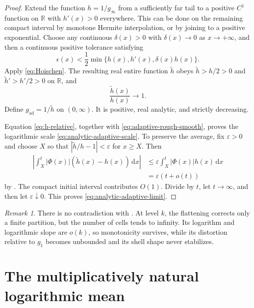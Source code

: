 \documentclass[11pt,oneside]{article}
\numberwithin{equation}{section}
\theoremstyle{definition}
\theoremstyle{remark}
\newtheorem{remark}[theorem]{Remark}
\newcommand{\R}{\mathbb R}
\newcommand{\dd}{\,\mathrm d}
\newcommand{\abs}[1]{\left|#1\right|}
\newcommand{\PhiUp}{\Phi}
\begin{document}
\begin{proof}
Extend the function \(h=1/g_\infty\) from a sufficiently far tail to a positive
\(C^1\) function on \(\R\) with \(h'(x)>0\) everywhere.  This can be done on the remaining
compact interval by monotone Hermite interpolation, or by joining to a positive exponential.
Choose any continuous \(\delta(x)>0\) with \(\delta(x)\to0\) as \(x\to+\infty\), and then
a continuous positive tolerance satisfying
\begin{equation}
 \epsilon(x)<\frac12\min\{h(x),h'(x),\delta(x)h(x)\}.
 \label{eq:analytic-tolerance}
\end{equation}
Apply \eqref{eq:Hoischen}.  The resulting real entire function \(\widetilde h\) obeys
\(
 \widetilde h>h/2>0
\) and \(\widetilde h'>h'/2>0\) on \(\R\), and
\begin{equation}
 \frac{\widetilde h(x)}{h(x)}\longrightarrow1.
 \label{eq:h-relative}
\end{equation}
Define \(g_{\mathrm{ad}}=1/\widetilde h\) on \((0,\infty)\).  It is positive, real analytic,
and strictly decreasing.

Equation \eqref{eq:h-relative}, together with
\eqref{eq:adaptive-rough-smooth}, proves the logarithmic scale
\eqref{eq:analytic-adaptive-scale}.  To preserve the average, fix \(\varepsilon>0\) and
choose \(X\) so that \(|\widetilde h/h-1|<\varepsilon\) for \(x\ge X\).  Then
\begin{align*}
 \left|\int_X^t\abs{\PhiUp(x)}(\widetilde h(x)-h(x))\dd x\right|
 &\le\varepsilon\int_X^t\abs{\PhiUp(x)}h(x)\dd x\\
 &=\varepsilon(t+o(t))
\end{align*}
by .  The compact initial interval contributes \(O(1)\).
Divide by \(t\), let \(t\to\infty\), and then let \(\varepsilon\downarrow0\).  This proves
\eqref{eq:analytic-adaptive-limit}.
\end{proof}

\begin{remark}
There is no contradiction with .  At level \(k\), the
flattening corrects only a finite partition, but the number of cells tends to infinity.  Its
logarithm and logarithmic slope are \(o(k)\), so monotonicity survives, while its distortion
relative to \(g_1\) becomes unbounded and its shell shape never stabilizes.
\end{remark}

\section{The multiplicatively natural logarithmic mean}
\label{sec:logmean}
\end{document}
